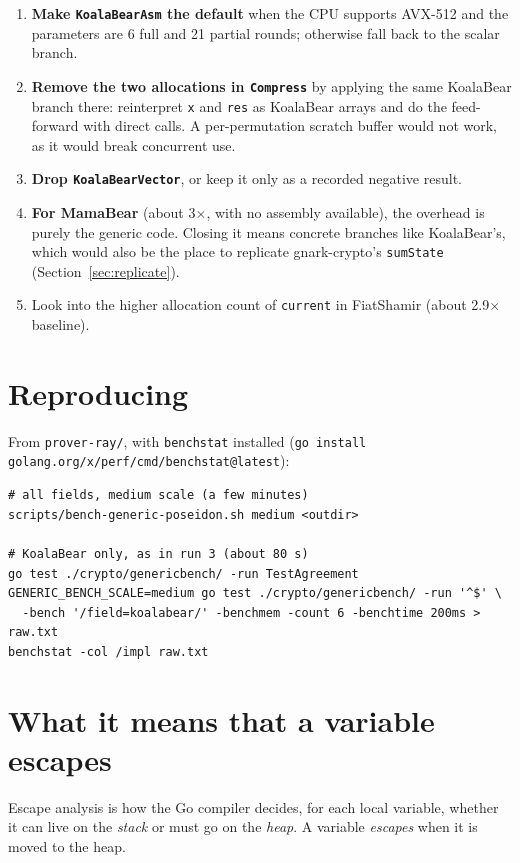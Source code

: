 \documentclass[10pt,a4paper]{article}
\begin{document}
\begin{enumerate}
  \item \textbf{Make \texttt{KoalaBearAsm} the default} when the CPU supports AVX-512 and the
    parameters are 6 full and 21 partial rounds; otherwise fall back to the scalar branch.
  \item \textbf{Remove the two allocations in \texttt{Compress}} by applying the same
    KoalaBear branch there: reinterpret \texttt{x} and \texttt{res} as KoalaBear arrays and
    do the feed-forward with direct calls. A per-permutation scratch buffer would not work,
    as it would break concurrent use.
  \item \textbf{Drop \texttt{KoalaBearVector}}, or keep it only as a recorded negative
    result.
  \item \textbf{For MamaBear} (about 3$\times$, with no assembly available), the overhead is
    purely the generic code. Closing it means concrete branches like KoalaBear's, which would
    also be the place to replicate gnark-crypto's \texttt{sumState}
    (Section~\ref{sec:replicate}).
  \item Look into the higher allocation count of \texttt{current} in FiatShamir (about
    2.9$\times$ baseline).
\end{enumerate}

\appendix
\section{Reproducing}

From \texttt{prover-ray/}, with \texttt{benchstat} installed
(\texttt{go install golang.org/x/perf/cmd/benchstat@latest}):
\begin{lstlisting}
# all fields, medium scale (a few minutes)
scripts/bench-generic-poseidon.sh medium <outdir>

# KoalaBear only, as in run 3 (about 80 s)
go test ./crypto/genericbench/ -run TestAgreement
GENERIC_BENCH_SCALE=medium go test ./crypto/genericbench/ -run '^$' \
  -bench '/field=koalabear/' -benchmem -count 6 -benchtime 200ms > raw.txt
benchstat -col /impl raw.txt
\end{lstlisting}

\section{What it means that a variable escapes}\label{sec:escape}

Escape analysis is how the Go compiler decides, for each local variable, whether it can live
on the \emph{stack} or must go on the \emph{heap}. A variable \emph{escapes} when it is moved
to the heap.
\end{document}
